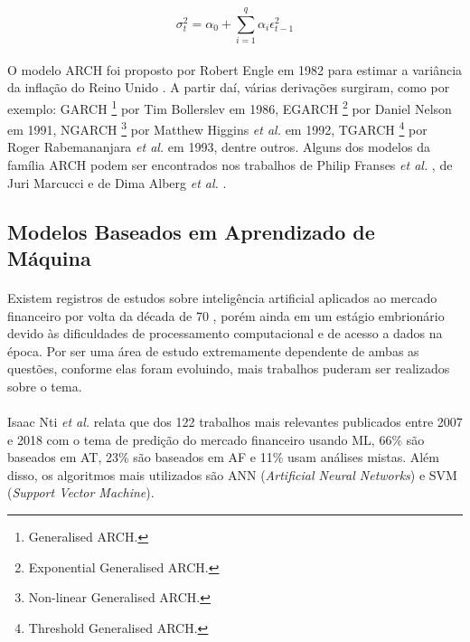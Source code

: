 \begin{equation} \label{eq:4}
\sigma_t^2 = \alpha_0 + \sum_{i=1}^{q} \alpha_i\epsilon_{t-1}^{2}
\end{equation}

\paragraph{} O modelo ARCH foi proposto por Robert Engle em 1982 para estimar a variância da inflação do Reino Unido \cite{engle1982autoregressive}. A partir daí, várias derivações surgiram, como por exemplo: GARCH \footnote{Generalised ARCH.} por Tim Bollerslev \cite{bollerslev1986generalized} em 1986, EGARCH \footnote{Exponential Generalised ARCH.} por Daniel Nelson \cite{nelson1991conditional} em 1991, NGARCH \footnote{Non-linear Generalised ARCH.} por Matthew Higgins \textit{et al.} \cite{higgins1992class} em 1992, TGARCH \footnote{Threshold Generalised ARCH.} por Roger Rabemananjara \textit{et al.} \cite{rabemananjara1993threshold} em 1993, dentre outros. Alguns dos modelos da família ARCH podem ser encontrados nos trabalhos de Philip Franses \textit{et al.} \cite{franses1996forecasting}, de Juri Marcucci \cite{marcucci2005forecasting} e de Dima Alberg \textit{et al.} \cite{alberg2008estimating}.



\FloatBarrier
\subsection{Modelos Baseados em Aprendizado de Máquina}
\label{sub:ml_models_study}

\paragraph{} Existem registros de estudos sobre inteligência artificial aplicados ao mercado financeiro por volta da década de 70 \cite{felsen1975artificial}, porém ainda em um estágio embrionário devido às dificuldades de processamento computacional e de acesso a dados na época. Por ser uma área de estudo extremamente dependente de ambas as questões, conforme elas foram evoluindo, mais trabalhos puderam ser realizados sobre o tema.

\paragraph{} Isaac Nti \textit{et al.} \cite{nti2020systematic} relata que dos 122 trabalhos mais relevantes publicados entre 2007 e 2018 com o tema de predição do mercado financeiro usando ML, 66\% são baseados em AT, 23\% são baseados em AF e 11\% usam análises mistas. Além disso, os algoritmos mais utilizados são ANN (\textit{Artificial Neural Networks}) e SVM (\textit{Support Vector Machine}).

